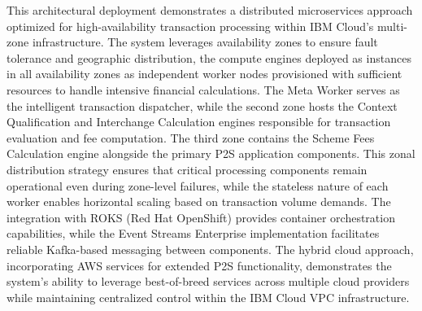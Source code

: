 This architectural deployment demonstrates a distributed microservices approach optimized for high-availability transaction processing within IBM Cloud's multi-zone infrastructure. The system leverages  availability zones to ensure fault tolerance and geographic distribution, the compute engines deployed as instances in all availability zones as independent worker nodes provisioned with sufficient resources  to handle intensive financial calculations. 
The Meta Worker serves as the intelligent transaction dispatcher, while the second zone hosts the Context Qualification and Interchange Calculation engines responsible for transaction evaluation and fee computation. The third zone contains the Scheme Fees Calculation engine alongside the primary P2S application components.
This zonal distribution strategy ensures that critical processing components remain operational even during zone-level failures, while the stateless nature of each worker enables horizontal scaling based on transaction volume demands. The integration with ROKS (Red Hat OpenShift) provides container orchestration capabilities, while the Event Streams Enterprise implementation facilitates reliable Kafka-based messaging between components. The hybrid cloud approach, incorporating AWS services for extended P2S functionality, demonstrates the system's ability to leverage best-of-breed services across multiple cloud providers while maintaining centralized control within the IBM Cloud VPC infrastructure.





